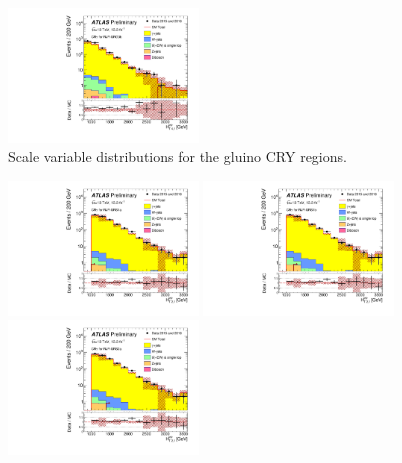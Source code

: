 \begin{figure}[tbph]
\begin{center}
\includegraphics[width=0.45\textwidth]{figures/ATLAS-CONF-2016-078_INT/N-1Plots/AtlasStyle/Preliminary/CRY_SRJigsawSRG3b_LastCut_CRY_minusone}
\end{center}
\caption{Scale variable distributions for the gluino CRY regions.}
\label{fig:CRY_SRJigsawSRG1a_LastCut_CRY_minusone}
\end{figure}

\clearpage
\begin{figure}[tbph]
\begin{center}
\includegraphics[width=0.45\textwidth]{figures/ATLAS-CONF-2016-078_INT/N-1Plots/AtlasStyle/Preliminary/CRY_SRJigsawSRS1a_LastCut_CRY_minusone}
\includegraphics[width=0.45\textwidth]{figures/ATLAS-CONF-2016-078_INT/N-1Plots/AtlasStyle/Preliminary/CRY_SRJigsawSRS1b_LastCut_CRY_minusone}
\includegraphics[width=0.45\textwidth]{figures/ATLAS-CONF-2016-078_INT/N-1Plots/AtlasStyle/Preliminary/CRY_SRJigsawSRS2a_LastCut_CRY_minusone}

\end{center}
\end{figure}
